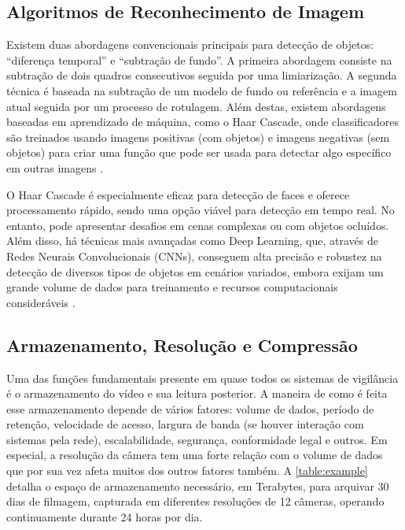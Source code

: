 \documentclass[12pt, %
openright, 
oneside, %
a4paper,    %
brazil]{facom-ufu-abntex2}
\begin{document}
\subsection{Algoritmos de Reconhecimento de Imagem}

Existem duas abordagens convencionais principais para detecção de objetos:
``diferença temporal'' e ``subtração de fundo''. A primeira abordagem consiste
na subtração de dois quadros consecutivos seguida por uma limiarização. A
segunda técnica é baseada na subtração de um modelo de fundo ou referência e a
imagem atual seguida por um processo de rotulagem. Além destas, existem
abordagens baseadas em aprendizado de máquina, como o Haar Cascade, onde
classificadores são treinados usando imagens positivas (com objetos) e imagens
negativas (sem objetos) para criar uma função que pode ser usada para detectar
algo específico em outras imagens \cite{Valera2005IntelligentDS31}.

O Haar Cascade é especialmente eficaz para detecção de faces e oferece
processamento rápido, sendo uma opção viável para detecção em tempo real. No
entanto, pode apresentar desafios em cenas complexas ou com objetos ocluídos.
Além disso, há técnicas mais avançadas como Deep Learning, que, através de
Redes Neurais Convolucionais (CNNs), conseguem alta precisão e robustez na
detecção de diversos tipos de objetos em cenários variados, embora exijam um
grande volume de dados para treinamento e recursos computacionais consideráveis
\cite{MLKHaarCascade2021}.

\subsection{Armazenamento, Resolução e Compressão}

Uma das funções fundamentais presente em quase todos os sistemas de vigilância
é o armazenamento do vídeo e sua leitura posterior. A maneira de como é feita
esse armazenamento depende de vários fatores: volume de dados, período de
retenção, velocidade de acesso, largura de banda (se houver interação com
sistemas pela rede), escalabilidade, segurança, conformidade legal e outros. Em
especial, a resolução da câmera tem uma forte relação com o volume de dados que
por sua vez afeta muitos dos outros fatores também. A \autoref{table:example}
detalha o espaço de armazenamento necessário, em Terabytes, para arquivar 30
dias de filmagem, capturada em diferentes resoluções de 12 câmeras, operando
continuamente durante 24 horas por dia.  %
\end{document}
